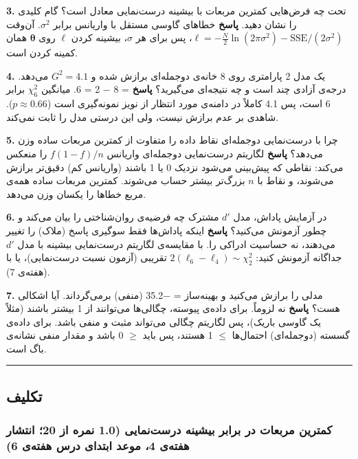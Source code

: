 \textbf{3.} تحت چه فرض‌هایی کمترین مربعات با بیشینه درست‌نمایی معادل است؟
گام کلیدی را نشان دهید. \textbf{پاسخ} خطاهای گاوسی مستقل با واریانس
برابر \(\sigma^2\). آن‌وقت
\(\ell = -\tfrac{N}{2}\ln(2\pi\sigma^2) - \mathrm{SSE}/(2\sigma^2)\)، پس
برای هر \(\sigma\)، بیشینه کردن \(\ell\) روی \(\boldsymbol\theta\) همان
کمینه کردن  است.

\textbf{4.} یک مدل 2 پارامتری روی 8 خانه‌ی دوجمله‌ای برازش شده و
\(G^2 = 4.1\) می‌دهد. درجه‌ی آزادی چند است و چه نتیجه‌ای می‌گیرید؟
\textbf{پاسخ}  = 8 \ensuremath{-} 2 = 6. میانگین \(\chi^2_6\) برابر 6 است، پس
4.1 کاملاً در دامنه‌ی مورد انتظار از نویز نمونه‌گیری است
(\(p \approx 0.66\)). شاهدی بر عدم برازش نیست، ولی این درستی مدل را ثابت
نمی‌کند.

\textbf{5.} چرا  با درست‌نمایی دوجمله‌ای نقاط داده را متفاوت از
کمترین مربعات ساده وزن می‌دهد؟ \textbf{پاسخ} لگاریتم درست‌نمایی دوجمله‌ای
واریانس \(f(1-f)/n\) را منعکس می‌کند: نقاطی که پیش‌بینی می‌شود نزدیک 0 یا 1
باشند (واریانس کم) دقیق‌تر برازش می‌شوند، و نقاط با \(n\) بزرگ‌تر بیشتر
حساب می‌شوند. کمترین مربعات ساده همه‌ی مربع خطاها را یکسان وزن می‌دهد.

\textbf{6.} در آزمایش پاداش، مدل \(d'\) مشترک چه فرضیه‌ی روان‌شناختی را
بیان می‌کند و چطور آزمونش می‌کنید؟ \textbf{پاسخ} اینکه پاداش‌ها فقط سوگیری
پاسخ (ملاک) را تغییر می‌دهند، نه حساسیت ادراکی را. با مقایسه‌ی لگاریتم
درست‌نمایی بیشینه با مدل \(d'\) جداگانه آزمونش کنید:
\(2(\ell_6 - \ell_4) \sim \chi^2_2\) تقریبی (آزمون نسبت درست‌نمایی)، یا
با  (هفته‌ی 7).

\textbf{7.} مدلی را برازش می‌کنید و بهینه‌ساز  = \ensuremath{-}35.2 (منفی)
برمی‌گرداند. آیا اشکالی هست؟ \textbf{پاسخ} نه لزوماً. برای داده‌ی پیوسته،
چگالی‌ها می‌توانند از 1 بیشتر باشند (مثلاً یک گاوسی باریک)، پس لگاریتم
چگالی می‌تواند مثبت و  منفی باشد. برای داده‌ی گسسته (دوجمله‌ای)
احتمال‌ها \ensuremath{\leq} 1 هستند، پس  باید \ensuremath{\geq} 0 باشد و مقدار منفی نشانه‌ی باگ
است.

\begin{center}\rule{0.5\linewidth}{0.5pt}\end{center}


\subsection{تکلیف}

\subsubsection{\texorpdfstring{ کمترین مربعات در برابر بیشینه
درست‌نمایی (1.0 نمره از 20؛ انتشار هفته‌ی 4، موعد ابتدای درس هفته‌ی
6)}{A2: کمترین مربعات در برابر بیشینه درست‌نمایی (1.0 نمره از 20؛ انتشار هفته‌ی 4، موعد ابتدای درس هفته‌ی 6)}}

